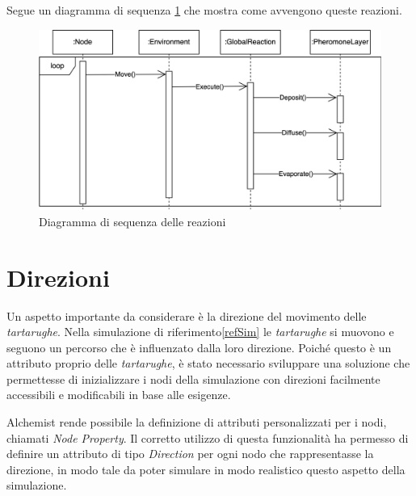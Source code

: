 Segue un diagramma di sequenza \cref{fig:seq3} che mostra come avvengono queste reazioni.
\begin{figure}[ht]
    \centering
    \includegraphics[width=.7\linewidth]{figures/seq3.png}
    \caption{Diagramma di sequenza delle reazioni}\label{fig:seq3}
\end{figure}

\section{Direzioni}
Un aspetto importante da considerare è la direzione del movimento delle \textit{tartarughe}. Nella simulazione di riferimento\space\ref{refSim} le \textit{tartarughe}
si muovono e seguono un percorso che è influenzato dalla loro direzione. Poiché questo è un attributo proprio delle \textit{tartarughe},
è stato necessario sviluppare una soluzione che permettesse di inizializzare i nodi della simulazione con direzioni facilmente accessibili 
e modificabili in base alle esigenze.

Alchemist rende possibile la definizione di attributi personalizzati per i nodi, chiamati \textit{Node Property}. Il corretto utilizzo di questa
funzionalità ha permesso di definire un attributo di tipo \textit{Direction} per ogni nodo che rappresentasse la direzione, 
in modo tale da poter simulare in modo realistico questo aspetto della simulazione.